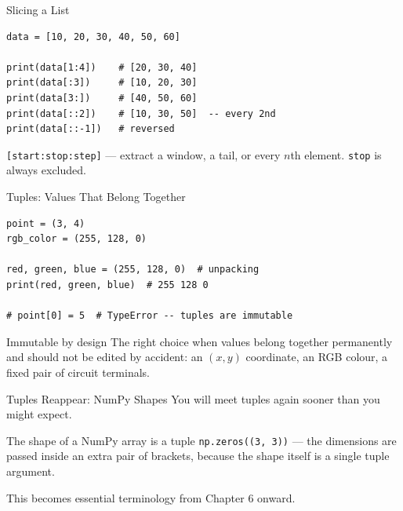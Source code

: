 \documentclass[9pt,aspectratio=169,xcolor=table]{beamer}
\begin{document}
\begin{frame}[fragile]{Slicing a List}
    \leavevmode
\begin{lstlisting}
data = [10, 20, 30, 40, 50, 60]

print(data[1:4])    # [20, 30, 40]
print(data[:3])     # [10, 20, 30]
print(data[3:])     # [40, 50, 60]
print(data[::2])    # [10, 30, 50]  -- every 2nd
print(data[::-1])   # reversed
\end{lstlisting}

    \vspace{2mm}
    {\small \texttt{[start:stop:step]} --- extract a window, a tail, or
    every $n$th element. \texttt{stop} is always excluded.}
\end{frame}

\begin{frame}[fragile]{Tuples: Values That Belong Together}
    \leavevmode
\begin{lstlisting}
point = (3, 4)
rgb_color = (255, 128, 0)

red, green, blue = (255, 128, 0)  # unpacking
print(red, green, blue)  # 255 128 0

# point[0] = 5  # TypeError -- tuples are immutable
\end{lstlisting}

    \vspace{2mm}
    \begin{alertblock}{Immutable by design}
        The right choice when values belong together permanently and
        should not be edited by accident: an $(x,y)$ coordinate, an RGB
        colour, a fixed pair of circuit terminals.
    \end{alertblock}
\end{frame}

\begin{frame}{Tuples Reappear: NumPy Shapes}
    \leavevmode
    You will meet tuples again sooner than you might expect.

    \vspace{3mm}
    \begin{block}{The shape of a NumPy array is a tuple}
        \texttt{np.zeros((3, 3))} --- the dimensions are passed inside
        an \alert{extra pair of brackets}, because the shape itself is
        a single tuple argument.
    \end{block}

    \vspace{3mm}
    {\small This becomes essential terminology from Chapter 6 onward.}
\end{frame}
\end{document}
